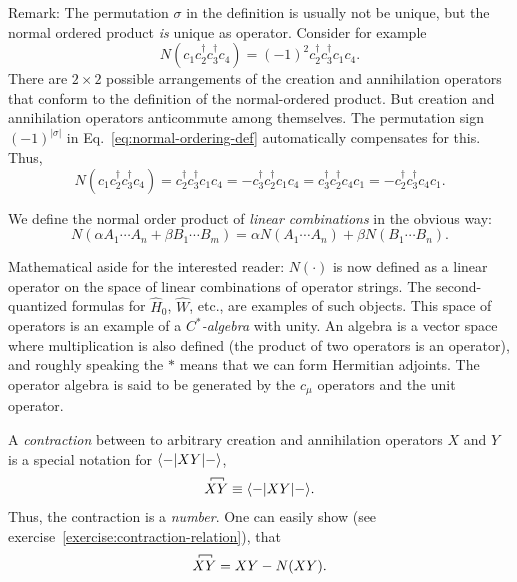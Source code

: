 \documentclass{report}
\theoremstyle{plain}
\theoremstyle{definition}
\begin{document}
Remark: The permutation $\sigma$ in the definition is usually not be unique,
but the normal ordered product \emph{is} unique as operator. Consider for
example
\begin{equation}
   N( c_1 c^\dag_2 c^\dag_3 c_4 ) = (-1)^2 c^\dag_2 c^\dag_3 c_1 c_4. 
\end{equation} 
There are $2\times 2$ possible arrangements of the creation and
annihilation operators that conform to the definition of the
normal-ordered product. But creation and annihilation operators
anticommute among themselves. The permutation sign $(-1)^{|\sigma|}$
in Eq.~\eqref{eq:normal-ordering-def} automatically compensates for
this. Thus,
\begin{equation}
   N( c_1 c^\dag_2 c^\dag_3 c_4 ) = c^\dag_2 c^\dag_3 c_1 c_4 =
   - c^\dag_3 c^\dag_2 c_1 c_4 = c^\dag_3 c^\dag_2 c_4
   c_1 = -c^\dag_2 c^\dag_3 c_4 c_1.
\end{equation}

We define the normal order product of \emph{linear combinations} in
the obvious way:
\begin{equation}
  N(\alpha A_1\cdots A_n + \beta B_1\cdots B_m) = \alpha N(A_1\cdots
  A_n) + \beta N(B_1\cdots B_n).
\end{equation}

Mathematical aside for the interested reader: $N(\cdot)$ is now defined as a
linear operator on the space of linear combinations of operator
strings. The second-quantized formulas for $\hat{H}_0$,
$\hat{W}$, etc., are examples of such objects. This space of operators
is an example of a \emph{$C^*$-algebra} with unity. An algebra is a vector
space where multiplication is also defined (the product of two
operators is an operator), and roughly speaking the $*$ means that we can form
Hermitian adjoints. The operator algebra is said
to be generated by the $c_\mu$ operators and the unit operator.

A \emph{contraction} between to arbitrary creation and annihilation
operators ${X}$ and ${Y}$ is a special notation for $\braket{-|XY|-}$,
\begin{align}
\contraction[0.5ex]{}{{X}}{}{{Y}}{} 
{X}{Y}  \equiv \for{-}{{X}{Y}}{-}. \label{eq:contr-def}
\end{align}
Thus, the contraction is a \emph{number}. One can easily show (see exercise~\ref{exercise:contraction-relation}), that
\begin{align}
\contraction[0.5ex]{}{{X}}{}{{Y}}{} 
{X}{Y}  = {X}{Y} - N({X}{Y}). \label{eq:contr-def-2}
\end{align}
\end{document}
